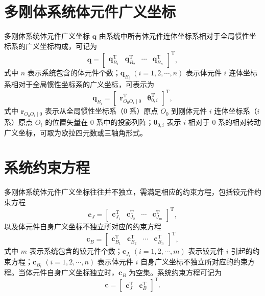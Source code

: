 \section{多刚体系统体元件广义坐标}

多刚体系统体元件广义坐标 $\boldsymbol{q}$ 由系统中所有体元件连体坐标系相对于全局惯性坐标系的广义坐标构成，可记为
\begin{equation}\label{eq:9.1}
  \boldsymbol{q} = \begin{bmatrix} \boldsymbol{q}_{B_1}^{\mathrm{T}} & \boldsymbol{q}_{B_2}^{\mathrm{T}} & \cdots & \boldsymbol{q}_{B_n}^{\mathrm{T}} \end{bmatrix}^{\mathrm{T}},
\end{equation}
式中 $n$ 表示系统包含的体元件个数；$\boldsymbol{q}_{B_i}\;(i=1,2,\cdots,n)$ 表示体元件 $i$ 连体坐标系相对于全局惯性坐标系的广义坐标，可表示为
\begin{equation}\label{eq:9.2}
  \boldsymbol{q}_{B_i} = \begin{bmatrix} \boldsymbol{r}_{O_0 O_i \mid 0}^{\mathrm{T}} & \boldsymbol{\theta}_{0,i}^{\mathrm{T}} \end{bmatrix}^{\mathrm{T}},
\end{equation}
式中 $\boldsymbol{r}_{O_0 O_i \mid 0}$ 表示从全局惯性坐标系（$0$ 系）原点 $O_0$ 到刚体元件 $i$ 连体坐标系（$i$ 系）原点 $O_i$ 的位置矢量在 $0$ 系中的投影列阵；$\boldsymbol{\theta}_{0,i}$ 表示 $i$ 相对于 $0$ 系的相对转动广义坐标，可取为欧拉四元数或三轴角形式。

\section{系统约束方程}

多刚体系统体元件广义坐标往往并不独立，需满足相应的约束方程，包括铰元件约束方程
\begin{equation}\label{eq:9.3}
  \boldsymbol{c}_J = \begin{bmatrix} \boldsymbol{c}_{J_1}^{\mathrm{T}} & \boldsymbol{c}_{J_2}^{\mathrm{T}} & \cdots & \boldsymbol{c}_{J_m}^{\mathrm{T}} \end{bmatrix}^{\mathrm{T}},
\end{equation}
以及体元件自身广义坐标不独立所对应的约束方程
\begin{equation}\label{eq:9.4}
  \boldsymbol{c}_B = \begin{bmatrix} \boldsymbol{c}_{B_1}^{\mathrm{T}} & \boldsymbol{c}_{B_2}^{\mathrm{T}} & \cdots & \boldsymbol{c}_{B_n}^{\mathrm{T}} \end{bmatrix}^{\mathrm{T}},
\end{equation}
式中 $m$ 表示系统包含的铰元件个数；$\boldsymbol{c}_{J_i}\;(i=1,2,\cdots,m)$ 表示铰元件 $i$ 引起的约束方程；$\boldsymbol{c}_{B_i}\;(i=1,2,\cdots,n)$ 表示体元件 $i$ 自身广义坐标不独立所对应的约束方程。当体元件自身广义坐标独立时，$\boldsymbol{c}_B$ 为空集。系统约束方程可记为
\begin{equation}\label{eq:9.5}
  \boldsymbol{c} = \begin{bmatrix} \boldsymbol{c}_J^{\mathrm{T}} & \boldsymbol{c}_B^{\mathrm{T}} \end{bmatrix}^{\mathrm{T}}.
\end{equation}

